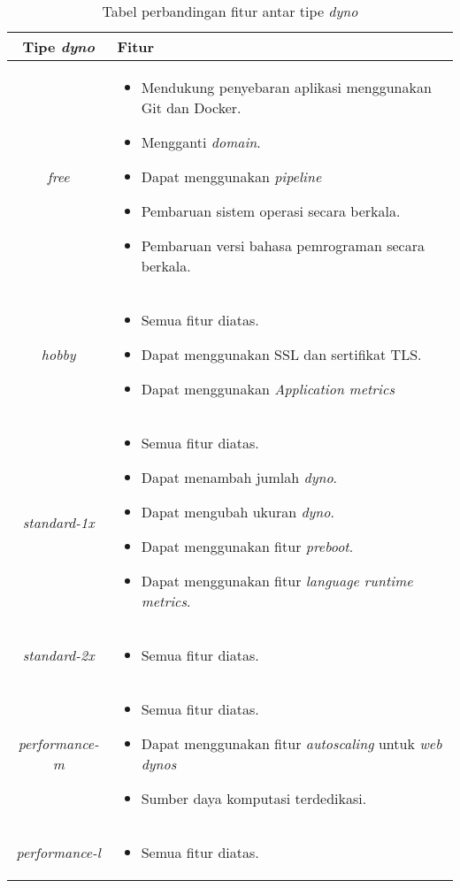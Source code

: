\begin{center}
\begin{table}[H]
\caption{Tabel perbandingan fitur antar tipe \textit{dyno}}
\label{table:compare-dyno-type-2}
\begin{tabular}{|c|p{11cm}|}
\hline
Tipe \textit{dyno} & Fitur\\
\hline
\textit{free} & \begin{itemize}
	\item Mendukung penyebaran aplikasi menggunakan Git dan Docker.
	\item Mengganti \textit{domain}.
	\item Dapat menggunakan \textit{pipeline}\footnotemark
	\item Pembaruan sistem operasi secara berkala.
	\item Pembaruan versi bahasa pemrograman secara berkala.
\end{itemize} \\
\hline
\textit{hobby} & \begin{itemize}
	\item Semua fitur diatas.
	\item Dapat menggunakan SSL dan sertifikat TLS.
	\item Dapat menggunakan \textit{Application metrics}
\end{itemize}\\
\hline
\textit{standard-1x} & \begin{itemize}
	\item Semua fitur diatas.
	\item Dapat menambah jumlah \textit{dyno}.
	\item Dapat mengubah ukuran \textit{dyno}.
	\item Dapat menggunakan fitur \textit{preboot}.
	\item Dapat menggunakan fitur \textit{language runtime metrics}.
\end{itemize}\\
\hline
\textit{standard-2x} & \begin{itemize}
	\item Semua fitur diatas.
\end{itemize}\\
\hline
\textit{performance-m} & \begin{itemize}
	\item Semua fitur diatas.
	\item Dapat menggunakan fitur \textit{autoscaling} untuk \textit{web dynos}
	\item Sumber daya komputasi terdedikasi.
\end{itemize}\\
\hline
\textit{performance-l} & \begin{itemize}
	\item Semua fitur diatas.
\end{itemize}\\
\hline
\end{tabular}
\end{table}
\end{center}

